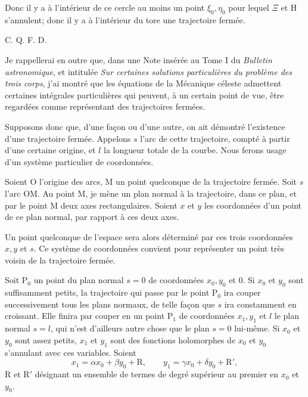 \documentclass[11pt]{article}
\begin{document}
Donc il y a à l’intérieur de ce cercle au moins un point $\xi_0,\eta_0$ pour lequel $\Xi$ et $\mathrm{H}$ s’annulent; donc il y a à l’intérieur du tore une trajectoire fermée.
\begin{flushright}C. Q. F. D.\end{flushright}

Je rappellerai en outre que, dans une Note insérée au Tome I du \emph{Bulletin astronomique}, et intitulée \emph{Sur certaines solutions particulières du problème des trois corps}, j’ai montré que les équations de la Mécanique céleste admettent certaines intégrales particulières qui peuvent, à un certain point de vue, être regardées comme représentant des trajectoires fermées.

Supposons donc que, d’une façon ou d’une autre, on ait démontré l’existence d’une trajectoire fermée. Appelons $s$ l’arc de cette trajectoire, compté à partir d’une certaine origine, et $l$ la longueur totale de la courbe. Nous ferons usage d’un système particulier de coordonnées.

Soient O l’origine des arcs, M un point quelconque de la trajectoire fermée. Soit $s$ l’arc OM. Au point M, je mène un plan normal à la trajectoire, dans ce plan, et par le point M deux axes rectangulaires. Soient $x$ et $y$ les coordonnées d’un point de ce plan normal, par rapport à ces deux axes.

Un point quelconque de l’espace sera alors déterminé par ces trois coordonnées $x,y$ et $s$. Ce système de coordonnées convient pour représenter un point très voisin de la trajectoire fermée.

Soit $\mathrm{P}_0$ un point du plan normal $s=0$ de coordonnées $x_0,y_0$ et $0$. Si $x_0$ et $y_0$ sont suffisamment petits, la trajectoire qui passe par le point $\mathrm{P}_0$ ira couper successivement tous les plans normaux, de telle façon que $s$ ira constamment en croissant. Elle finira par couper en un point $\mathrm{P}_1$ de coordonnées $x_1,y_1$ et $l$ le plan normal $s=l$, qui n’est d’ailleurs autre chose que le plan $s=0$ lui-même. Si $x_0$ et $y_0$ sont assez petits, $x_1$ et $y_1$ sont des fonctions holomorphes de $x_0$ et $y_0$ s’annulant avec ces variables. Soient
\[
x_1=\alpha x_0+\beta y_0+\mathrm{R},
\qquad
y_1=\gamma x_0+\delta y_0+\mathrm{R}',
\]
$\mathrm{R}$ et $\mathrm{R}'$ désignant un ensemble de termes de degré supérieur au premier en $x_0$ et $y_0$.
\end{document}
